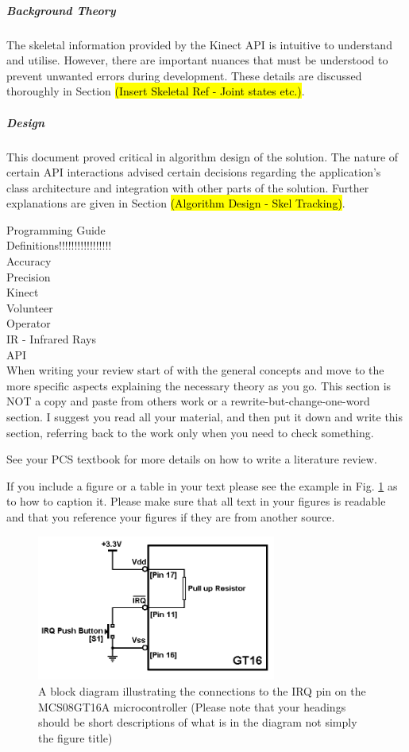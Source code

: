 \subparagraph{Background Theory}
The skeletal information provided by the Kinect API is intuitive to understand and utilise. However, there are important nuances that must be understood to prevent unwanted errors during development. These details are discussed thoroughly in Section \hl{(Insert Skeletal Ref - Joint states etc.)}. 

\subparagraph{Design}
This document proved critical in algorithm design of the solution. The nature of certain API interactions advised certain decisions regarding the application's class architecture and integration with other parts of the solution. Further explanations are given in Section \hl{(Algorithm Design - Skel Tracking)}. 

Programming Guide\\

Definitions!!!!!!!!!!!!!!!!!\\
Accuracy\\
Precision\\
Kinect\\
Volunteer\\
Operator\\
IR - Infrared Rays\\
API\\


When writing your review start of with the general concepts and move to the more specific aspects
explaining the necessary theory as you go. This section is NOT a copy and paste from others work or a
rewrite-but-change-one-word section. I suggest you read all your material, and then put it down and
write this section, referring back to the work only when you need to check something.

See your PCS textbook for more details on how to write a literature review.

If you include a figure or a table in your text please see the example in Fig. \ref{fig:model} as to how to caption it.
Please make sure that all text in your figures is readable and that you reference your figures if they are
from another source.

\begin{figure}[ht]
\centering
\includegraphics[width=0.7\textwidth]{model.png}
\caption{A block diagram illustrating the connections to the IRQ pin on the MCS08GT16A microcontroller (Please
note that your headings should be short descriptions of what is in the diagram not simply the figure title)}
\label{fig:model}
\end{figure}

